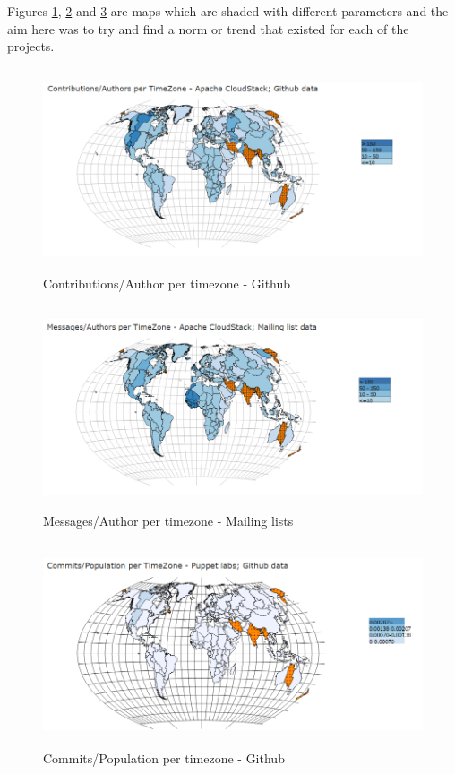 \documentclass[seploa]{beavtex}
\begin{document}
Figures \ref{fig:div1}, \ref{fig:div2} and \ref{fig:div3} are maps which are shaded with different parameters and the aim here was to try and find a norm or trend that existed for each of the projects.

\begin{figure}[H]
\centering
\includegraphics[width=130mm,height=60mm]{image8.PNG}
\caption{Contributions/Author per timezone - Github}
\label{fig:div1}
\end{figure}

\begin{figure}[H]
\centering
\includegraphics[width=130mm,height=60mm]{image9.PNG}
\caption{Messages/Author per timezone - Mailing lists}
\label{fig:div2}
\end{figure}

\begin{figure}[H]
\centering
\includegraphics[width=130mm,height=60mm]{image10.PNG}
\caption{Commits/Population per timezone - Github}
\label{fig:div3}
\end{figure}
\end{document}
